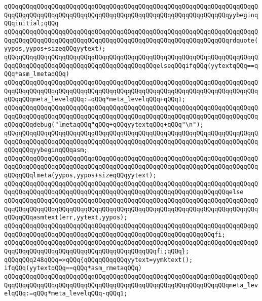 \verb|qQQqqQQqqQQqqQQqqQQqqQQqqQQqqQQqqQQqqQQqqQQqqQQqqQQqqQQqqQQqqQQqqQQqqQQqqQQqqQQqqQQqqQQqqQQqqQQqqQQqqQQqqQQqqQQqqQQqqQQqqQQqqQQqqQQqyybeginqQQqinitial;qQQq|\newline
\verb|qQQqqQQqqQQqqQQqqQQqqQQqqQQqqQQqqQQqqQQqqQQqqQQqqQQqqQQqqQQqqQQqqQQqqQQqqQQqqQQqqQQqqQQqqQQqqQQqqQQqqQQqqQQqqQQqqQQqqQQqqQQqqQQqqQQqrdquote(yypos,yypos+sizeqQQqyytext);|\newline
\verb|qQQqqQQqqQQqqQQqqQQqqQQqqQQqqQQqqQQqqQQqqQQqqQQqqQQqqQQqqQQqqQQqqQQqqQQqqQQqqQQqqQQqqQQqqQQqqQQqqQQqqQQqqQQqqQQqelseqQQqifqQQq(yytextqQQq==qQQq*asm_lmetaqQQq)|\newline
\verb|qQQqqQQqqQQqqQQqqQQqqQQqqQQqqQQqqQQqqQQqqQQqqQQqqQQqqQQqqQQqqQQqqQQqqQQqqQQqqQQqqQQqqQQqqQQqqQQqqQQqqQQqqQQqqQQqqQQqqQQqqQQqqQQqqQQqqQQqqQQqqQQqqQQqmeta_levelqQQq:=qQQq*meta_levelqQQq+qQQq1;|\newline
\verb|qQQqqQQqqQQqqQQqqQQqqQQqqQQqqQQqqQQqqQQqqQQqqQQqqQQqqQQqqQQqqQQqqQQqqQQqqQQqqQQqqQQqqQQqqQQqqQQqqQQqqQQqqQQqqQQqqQQqqQQqqQQqqQQqqQQqqQQqqQQqqQQqqQQqdebug("lmetaqQQq"qQQq+qQQqyytextqQQq+qQQq"\n");|\newline
\verb|qQQqqQQqqQQqqQQqqQQqqQQqqQQqqQQqqQQqqQQqqQQqqQQqqQQqqQQqqQQqqQQqqQQqqQQqqQQqqQQqqQQqqQQqqQQqqQQqqQQqqQQqqQQqqQQqqQQqqQQqqQQqqQQqqQQqqQQqqQQqqQQqqQQqyybeginqQQqasm;|\newline
\verb|qQQqqQQqqQQqqQQqqQQqqQQqqQQqqQQqqQQqqQQqqQQqqQQqqQQqqQQqqQQqqQQqqQQqqQQqqQQqqQQqqQQqqQQqqQQqqQQqqQQqqQQqqQQqqQQqqQQqqQQqqQQqqQQqqQQqqQQqqQQqqQQqqQQqlmeta(yypos,yypos+sizeqQQqyytext);|\newline
\verb|qQQqqQQqqQQqqQQqqQQqqQQqqQQqqQQqqQQqqQQqqQQqqQQqqQQqqQQqqQQqqQQqqQQqqQQqqQQqqQQqqQQqqQQqqQQqqQQqqQQqqQQqqQQqqQQqqQQqqQQqqQQqqQQqqQQqelse|\newline
\verb|qQQqqQQqqQQqqQQqqQQqqQQqqQQqqQQqqQQqqQQqqQQqqQQqqQQqqQQqqQQqqQQqqQQqqQQqqQQqqQQqqQQqqQQqqQQqqQQqqQQqqQQqqQQqqQQqqQQqqQQqqQQqqQQqqQQqqQQqqQQqqQQqqQQqasmtext(err,yytext,yypos);|\newline
\verb|qQQqqQQqqQQqqQQqqQQqqQQqqQQqqQQqqQQqqQQqqQQqqQQqqQQqqQQqqQQqqQQqqQQqqQQqqQQqqQQqqQQqqQQqqQQqqQQqqQQqqQQqqQQqqQQqqQQqqQQqqQQqqQQqfi;|\newline
\verb|qQQqqQQqqQQqqQQqqQQqqQQqqQQqqQQqqQQqqQQqqQQqqQQqqQQqqQQqqQQqqQQqqQQqqQQqqQQqqQQqqQQqqQQqqQQqqQQqqQQqqQQqqQQqqQQqfi;qQQq};|\newline
\verb|qQQqqQQq248qQQq=>qQQq{qQQqqQQqqQQqyytext=yymktext();|\newline
\verb|ifqQQq(yytextqQQq==qQQq*asm_rmetaqQQq)|\newline
\verb|qQQqqQQqqQQqqQQqqQQqqQQqqQQqqQQqqQQqqQQqqQQqqQQqqQQqqQQqqQQqqQQqqQQqqQQqqQQqqQQqqQQqqQQqqQQqqQQqqQQqqQQqqQQqqQQqqQQqqQQqqQQqqQQqqQQqmeta_levelqQQq:=qQQq*meta_levelqQQq-qQQq1;|\newline
